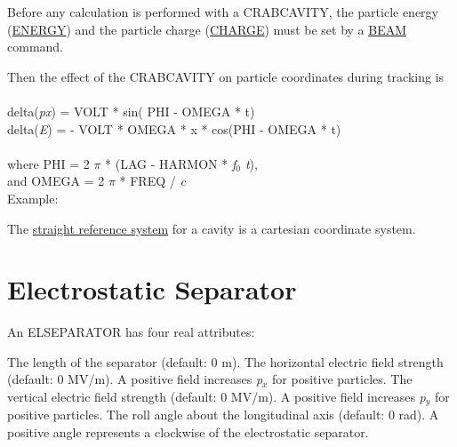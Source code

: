 
Before any calculation is performed with a CRABCAVITY, the particle
energy (\hyperref[sec:beam]{ENERGY}) and the particle charge
(\hyperref[sec:beam]{CHARGE}) must be set by a
\hyperref[sec:beam]{BEAM} command.   

Then the effect of the CRABCAVITY on particle coordinates during tracking is
\\
\\ delta(\textit{px})  = VOLT * sin( PHI - OMEGA * t) 
\\ delta(\textit{E})  = -  VOLT * OMEGA * x * cos(PHI - OMEGA * t) 
\\ 
\\ where PHI =  2 $\pi$ * (LAG - HARMON * \textit{f$_0$ t}), 
\\ and OMEGA = 2 $\pi$ * FREQ / \textit{c}
\\


Example: 

The \href{local_system.html#straight}{straight reference system} for a
cavity is a cartesian coordinate system.  
 


\section{Electrostatic Separator}
\label{sec:separator}


An ELSEPARATOR has four real attributes: 
\begin{madlist}
    The length of the separator (default: 0 m). 
    The horizontal electric field strength (default: 0 MV/m). 
     A positive field increases \textit{p$_x$} for positive particles.  
    The vertical electric field strength (default: 0 MV/m). 
     A positive field increases \textit{p$_y$} for positive particles.  
    The roll angle about the longitudinal axis (default: 0
     rad). A positive angle represents a clockwise of the electrostatic
     separator.  
\end{madlist}

